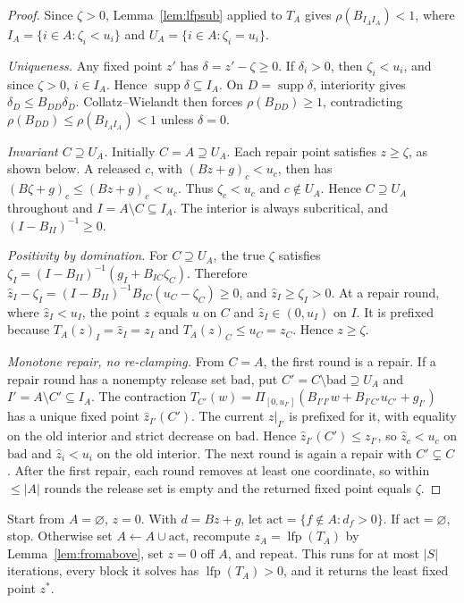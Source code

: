 \documentclass{llncs}
\newcommand{\clip}{\Pi}
\begin{document}
\begin{proof}
Since \(\zeta>0\), Lemma~\ref{lem:lfpsub} applied to \(T_A\) gives \(\rho(B_{I_AI_A})<1\), where \(I_A=\{i\in A:\zeta_i<u_i\}\) and \(U_A=\{i\in A:\zeta_i=u_i\}\).

\emph{Uniqueness.} Any fixed point \(z'\) has \(\delta=z'-\zeta\ge0\). If \(\delta_i>0\), then \(\zeta_i<u_i\), and since \(\zeta>0\), \(i\in I_A\). Hence \(\operatorname{supp}\delta\subseteq I_A\). On \(D=\operatorname{supp}\delta\), interiority gives \(\delta_D\le B_{DD}\delta_D\). Collatz--Wielandt then forces \(\rho(B_{DD})\ge1\), contradicting \(\rho(B_{DD})\le\rho(B_{I_AI_A})<1\) unless \(\delta=0\).

\emph{Invariant \(C\supseteq U_A\).} Initially \(C=A\supseteq U_A\). Each repair point satisfies \(z\ge\zeta\), as shown below. A released \(c\), with \((Bz+g)_c<u_c\), then has \((B\zeta+g)_c\le(Bz+g)_c<u_c\). Thus \(\zeta_c<u_c\) and \(c\notin U_A\). Hence \(C\supseteq U_A\) throughout and \(I=A\setminus C\subseteq I_A\). The interior is always subcritical, and \((I-B_{II})^{-1}\ge0\).

\emph{Positivity by domination.} For \(C\supseteq U_A\), the true \(\zeta\) satisfies \(\zeta_I=(I-B_{II})^{-1}(g_I+B_{IC}\zeta_C)\). Therefore \(\hat z_I-\zeta_I=(I-B_{II})^{-1}B_{IC}(u_C-\zeta_C)\ge0\), and \(\hat z_I\ge\zeta_I>0\). At a repair round, where \(\hat z_I<u_I\), the point \(z\) equals \(u\) on \(C\) and \(\hat z_I\in(0,u_I)\) on \(I\). It is prefixed because \(T_A(z)_I=\hat z_I=z_I\) and \(T_A(z)_C\le u_C=z_C\). Hence \(z\ge\zeta\).

\emph{Monotone repair, no re-clamping.} From \(C=A\), the first round is a repair. If a repair round has a nonempty release set \(\mathrm{bad}\), put \(C'=C\setminus\mathrm{bad}\supseteq U_A\) and \(I'=A\setminus C'\subseteq I_A\). The contraction \(T_{C'}(w)=\clip_{[0,u_{I'}]}(B_{I'I'}w+B_{I'C'}u_{C'}+g_{I'})\) has a unique fixed point \(\hat z_{I'}(C')\). The current \(z|_{I'}\) is prefixed for it, with equality on the old interior and strict decrease on \(\mathrm{bad}\). Hence \(\hat z_{I'}(C')\le z_{I'}\), so \(\hat z_c<u_c\) on \(\mathrm{bad}\) and \(\hat z_i<u_i\) on the old interior. The next round is again a repair with \(C'\subsetneq C\). After the first repair, each round removes at least one coordinate, so within \(\le|A|\) rounds the release set is empty and the returned fixed point equals \(\zeta\).
\end{proof}

\begin{lemma}
\label{lem:activation}
Start from \(A=\varnothing\), \(z=0\). With \(d=Bz+g\), let \(\mathrm{act}=\{f\notin A:d_f>0\}\). If \(\mathrm{act}=\varnothing\), stop. Otherwise set \(A\leftarrow A\cup\mathrm{act}\), recompute \(z_A=\operatorname{lfp}(T_A)\) by Lemma~\ref{lem:fromabove}, set \(z=0\) off \(A\), and repeat. This runs for at most \(|S|\) iterations, every block it solves has \(\operatorname{lfp}(T_A)>0\), and it returns the least fixed point \(z^\ast\).
\end{lemma}
\end{document}
